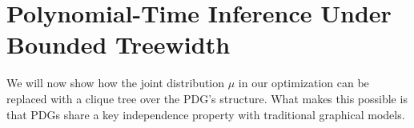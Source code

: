 \section{Polynomial-Time Inference Under Bounded Treewidth}
    \label{sec:clique-tree-expcone}

We will now show how the joint distribution $\mu$ in our optimization can be replaced
with a clique tree over the PDG's structure. What makes this possible is that
PDGs share a key independence property with traditional graphical models.

